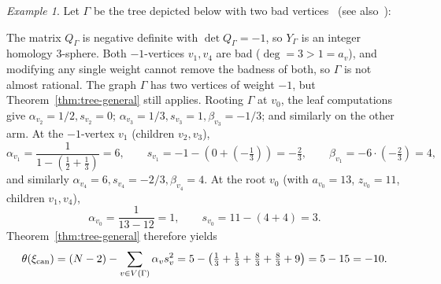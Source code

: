 \documentclass[11pt]{amsart}
\theoremstyle{plain}
\theoremstyle{definition}
\theoremstyle{remark}
\newtheorem{example}[theorem]{Example}
\begin{document}
\begin{example}\label{ex:non-AR-trefoil}
Let $\Gamma$ be the tree depicted below with two bad vertices~\cite[Example~4.4.1]{Nemethi2008} (see
also~\cite[Figure~1, $n=2$]{OzsvathStipsiczSzabo2014knots}): 

\begin{center}
\end{center}

The matrix $Q_\Gamma$ is negative definite with $\det Q_\Gamma = -1$,
so $Y_\Gamma$ is an integer homology 3-sphere. Both $-1$-vertices
$v_1, v_4$ are bad ($\deg = 3 > 1 = a_v$), and modifying any single
weight cannot remove the badness of both, so $\Gamma$ is not almost
rational. The graph $\Gamma$ has two vertices of weight $-1$, but
Theorem~\ref{thm:tree-general} still applies.
 Rooting $\Gamma$ at $v_0$,
the leaf computations give $\alpha_{v_2}=1/2, s_{v_2}=0$;
$\alpha_{v_3}=1/3, s_{v_3}=1, \beta_{v_3}=-1/3$; and similarly on the
other arm. At the $-1$-vertex $v_1$ (children $v_2, v_3$),
\[
\alpha_{v_1}=\frac{1}{1-(\tfrac12+\tfrac13)} = 6, \qquad
s_{v_1} = -1 - (0 + (-\tfrac13)) = -\tfrac23, \qquad
\beta_{v_1} = -6\cdot(-\tfrac23) = 4,
\]
and similarly $\alpha_{v_4}=6, s_{v_4}=-2/3, \beta_{v_4}=4$. At the
root $v_0$ (with $a_{v_0}=13$, $z_{v_0}=11$, children $v_1, v_4$),
\[
\alpha_{v_0} = \frac{1}{13-12} = 1, \qquad s_{v_0} = 11 - (4+4) = 3.
\]
Theorem~\ref{thm:tree-general} therefore yields
\[
\theta(\xi_{\rm can}) = (N-2) - \sum_{v\in V(\Gamma)} \alpha_v s_v^2
= 5 - \bigl(\tfrac13 + \tfrac13 + \tfrac83 + \tfrac83 + 9\bigr)
= 5 - 15 = -10.
\]
\end{example}
\end{document}
